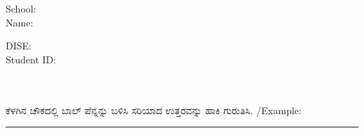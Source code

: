 \documentclass[12pt,
  english,
  oneside,
  pagemark,
  stamp,headheight=0cm]{sdaps}
\title{\-\vspace{1ex}\Large \textbf {\phantom {State Assessment Survey}}}
\begin{document}
\setlength{\checkboxsize}{3.5mm}
\begin{questionnaire}[noinfo]
  \vspace{-2ex}
  \hspace{1ex}
  \begin{minipage}{0.5\textwidth}
    School: \\[2ex]
    Name:
  \end{minipage}
  \begin{minipage}{0.3\textwidth}
    DISE:\\[2ex]
    Student ID:\\
  \end{minipage}\\[1ex]
  \hfill\\{\kannada ಕೆಳಗಿನ ಚೌಕದಲ್ಲಿ ಬಾಲ್ ಪೆನ್ನನ್ನು ಬಳಿಸಿ ಸರಿಯಾದ ಉತ್ತರವನ್ನು}{\large \checkmark} {\kannada ಹಾಕಿ ಗುರುತಿಸಿ.}
  /Example:\enspace\makebox[0pt][l]{$\square$}\raisebox{.15ex}{\hspace{0.1em}$\checkmark$}\\\hrule
  \begin{minipage}{0.47\textwidth}
    \begin{minipage}{1.0\textwidth}
      \begin{choicegroup}{}
      \end{choicegroup}
    \end{minipage}\\[1ex]
    \begin{minipage}{0.975\textwidth}
      \begin{choicegroup}{}
      \end{choicegroup}
    \end{minipage}
  \end{minipage}
  \hfill
  \begin{minipage}{0.5\textwidth}
    \begin{minipage}{0.45\textwidth}
      \begin{choicegroup}{}
      \end{choicegroup}
    \end{minipage}\\[1ex]
    \begin{minipage}{1.0\textwidth}

\end{minipage}
\end{minipage}
\end{questionnaire}
\end{document}

